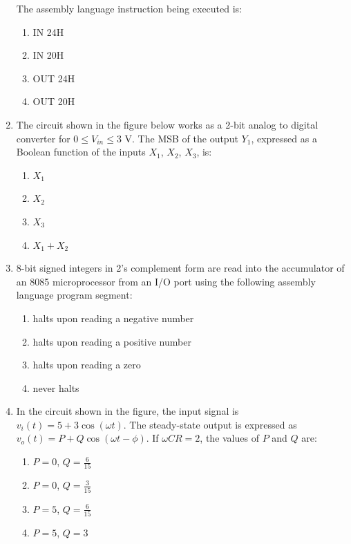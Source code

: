 \documentclass[journal]{IEEEtran}
\begin{document}
\begin{enumerate}
The assembly language instruction being executed is:

\begin{multicols}{2}
\begin{enumerate}
    \item IN 24H
    \item IN 20H
    \item OUT 24H
    \item OUT 20H
\end{enumerate}
\end{multicols}

\item The circuit shown in the figure below works as a 2-bit analog to digital converter for $0 \leq V_{in} \leq 3$ V. The MSB of the output $Y_1$, expressed as a Boolean function of the inputs $X_1$, $X_2$, $X_3$, is:

\begin{multicols}{2}
\begin{enumerate}
    \item $X_1$
    \item $X_2$
    \item $X_3$
    \item $X_1 + X_2$
\end{enumerate}
\end{multicols}

\item 8-bit signed integers in 2's complement form are read into the accumulator of an 8085 microprocessor from an I/O port using the following assembly language program segment:


\begin{multicols}{2}
\begin{enumerate}
    \item halts upon reading a negative number
    \item halts upon reading a positive number
    \item halts upon reading a zero
    \item never halts
\end{enumerate}
\end{multicols}

\item In the circuit shown in the figure, the input signal is $v_i(t) = 5 + 3 \cos(\omega t)$. The steady-state output is expressed as $v_o(t) = P + Q \cos(\omega t - \phi)$. If $\omega CR = 2$, the values of $P$ and $Q$ are:

\begin{multicols}{2}
\begin{enumerate}
    \item $P = 0$, $Q = \frac{6}{15}$
    \item $P = 0$, $Q = \frac{3}{15}$
    \item $P = 5$, $Q = \frac{6}{15}$
    \item $P = 5$, $Q = 3$
\end{enumerate}
\end{multicols}


\end{enumerate}
\end{document}
